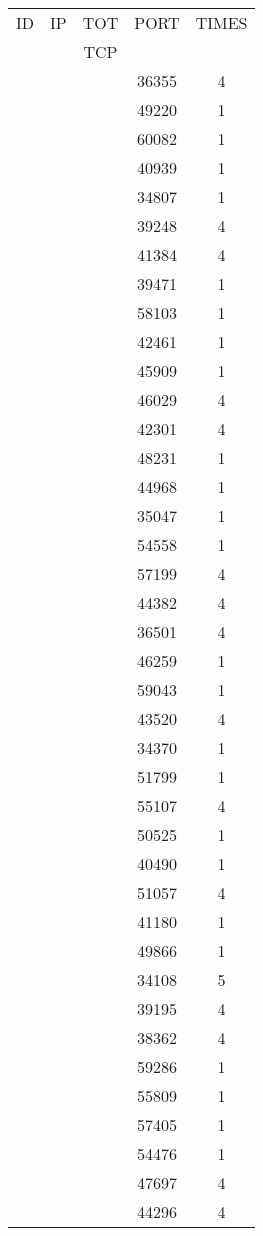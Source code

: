 \documentclass[a4paper]{scrartcl}
\begin{document}
\begin{minipage}[b]{0.5\linewidth}
\begin{tabular}{| c | c | c | c | c |}
\hline
ID & IP & TOT & PORT & TIMES \\ 
   &    & TCP &      &       \\ 
\hline
& & & 36355 & 4 \\ & & & 49220 & 1 \\ & & & 60082 & 1 \\ & & & 40939 & 1 \\ & & & 34807 & 1 \\ & & & 39248 & 4 \\ & & & 41384 & 4 \\ & & & 39471 & 1 \\ & & & 58103 & 1 \\ & & & 42461 & 1 \\ & & & 45909 & 1 \\ & & & 46029 & 4 \\ & & & 42301 & 4 \\ & & & 48231 & 1 \\ & & & 44968 & 1 \\ & & & 35047 & 1 \\ & & & 54558 & 1 \\ & & & 57199 & 4 \\ & & & 44382 & 4 \\ & & & 36501 & 4 \\ & & & 46259 & 1 \\ & & & 59043 & 1 \\ & & & 43520 & 4 \\ & & & 34370 & 1 \\ & & & 51799 & 1 \\ & & & 55107 & 4 \\ & & & 50525 & 1 \\ & & & 40490 & 1 \\ & & & 51057 & 4 \\ & & & 41180 & 1 \\ & & & 49866 & 1 \\ & & & 34108 & 5 \\ & & & 39195 & 4 \\ & & & 38362 & 4 \\ & & & 59286 & 1 \\ & & & 55809 & 1 \\ & & & 57405 & 1 \\ & & & 54476 & 1 \\ & & & 47697 & 4 \\ & & & 44296 & 4 \\ \hline\end{tabular}\end{minipage} \hfill\begin{minipage}[b]{0.5\linewidth}\begin{tabular}{| c | c | c | c | c |}

\end{tabular}
\end{minipage}
\end{document}
